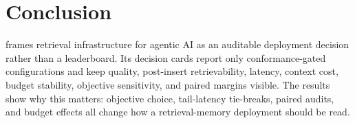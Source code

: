 \section{Conclusion}

\sys frames retrieval infrastructure for agentic AI as an auditable deployment decision rather than a leaderboard. Its decision cards report only conformance-gated configurations and keep quality, post-insert retrievability, \maxrowp latency, context cost, budget stability, objective sensitivity, and paired margins visible. The results show why this matters: objective choice, tail-latency tie-breaks, paired audits, and budget effects all change how a retrieval-memory deployment should be read.
